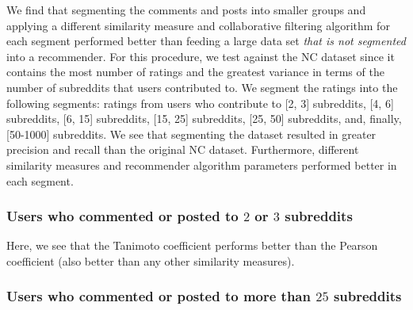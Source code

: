 \documentclass{article}
\begin{document}
We find that segmenting the comments and posts into smaller groups and applying a different similarity measure
and collaborative filtering algorithm for each segment performed better than  feeding a large data set \emph{that is not segmented} into a recommender. For this procedure, 
we test against the NC dataset since it contains the most number of ratings and the greatest variance
in terms of the number of subreddits that users contributed to. We segment the ratings into the following segments: 
ratings from users who contribute to [2, 3] subreddits, [4, 6] subreddits, [6, 15] subreddits, [15, 25] subreddits, [25, 50] 
subreddits, and, finally, [50-1000] subreddits. We see that segmenting the dataset
resulted in greater precision and recall than the original NC dataset. Furthermore, different similarity 
measures and recommender algorithm parameters performed better in each segment. 

\subsubsection{Users who commented or posted to $2$ or $3$ subreddits}\label{2-3-users}

Here, we see that the Tanimoto coefficient performs better than the Pearson coefficient (also 
better than any other similarity measures). 

\subsubsection{Users who commented or posted to more than $25$ subreddits}\label{more-than-25}
\end{document}
